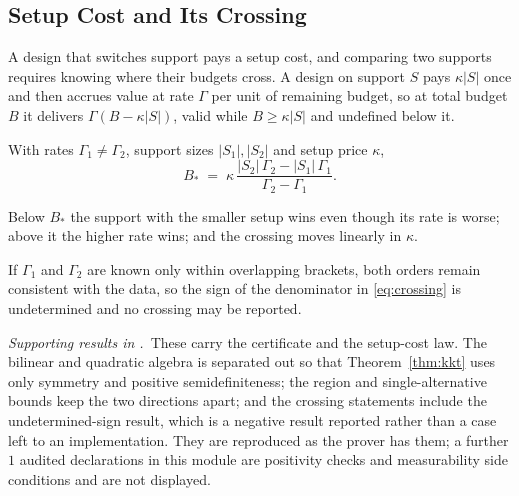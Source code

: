 \subsection{Setup Cost and Its Crossing}
\label{sec:setup}

A design that switches support pays a setup cost, and comparing two supports requires knowing
where their budgets cross. A design on support $S$ pays $\kappa|S|$ once and then accrues
value at rate $\Gamma$ per unit of remaining budget, so at total budget $B$ it delivers
$\Gamma(B-\kappa|S|)$, valid while $B\ge\kappa|S|$ and undefined below it.

\begin{theorem}
\label{thm:crossing}
With rates $\Gamma_{1}\neq\Gamma_{2}$, support sizes $|S_{1}|,|S_{2}|$ and setup price
$\kappa$,
\begin{equation}
B_{*}\;=\;\kappa\,\frac{|S_{2}|\,\Gamma_{2}-|S_{1}|\,\Gamma_{1}}{\Gamma_{2}-\Gamma_{1}} .
\label{eq:crossing}
\end{equation}
\end{theorem}


Below $B_{*}$ the support with the smaller setup wins even though its rate is worse; above it
the higher rate wins; and the crossing moves linearly in $\kappa$.

\begin{theorem}
\label{thm:undecided}
If $\Gamma_{1}$ and $\Gamma_{2}$ are known only within overlapping brackets, both orders
remain consistent with the data, so the sign of the denominator in \eqref{eq:crossing} is
undetermined and no crossing may be reported.
\end{theorem}


\noindent\emph{Supporting results in .}~These carry the certificate and the setup-cost law. The bilinear and quadratic algebra is separated out so that Theorem~\ref{thm:kkt} uses only symmetry and positive semidefiniteness; the region and single-alternative bounds keep the two directions apart; and the crossing statements include the undetermined-sign result, which is a negative result reported rather than a case left to an implementation. They are reproduced as the prover has them; a further $1$ audited declarations in this module are positivity checks and measurability side conditions and are not displayed.

